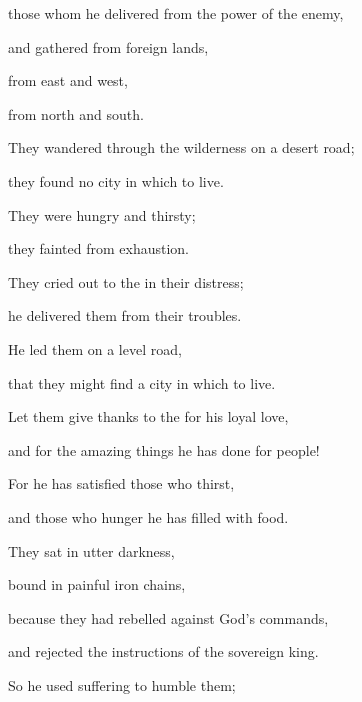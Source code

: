 {\par }{\Q those whom
he delivered
from the power
of the enemy,
\par }{\Q {}and gathered
from
foreign lands,
\par }{\Q from east
and west,
\par }{\Q from north
and south.
\par }{\Q {}They wandered
through the wilderness
on a desert
road;
\par }{\Q they found
no
city
in which to live.
\par }{\Q {}They were hungry
and thirsty;
\par }{\Q they fainted
from exhaustion.
\par }{\Q {}They cried out
to
the
{}
in their distress;
\par }{\Q he delivered
them
from their troubles.
\par }{\Q {}He led them on a level
road,
\par }{\Q that they might find a city
in which to live.
\par }{\Q {}Let them give thanks
to the
{}
for his loyal love,
\par }{\Q and for the amazing
things he has done for people!
\par }{\Q {}For
he has satisfied
those who
thirst,
\par }{\Q and those who
hunger
he has filled
with food.
\par }{\Q {}They sat
in utter darkness,
\par }{\Q bound
in painful
iron chains,
\par }{\Q {}because
they had rebelled
against God’s
commands,

\par }{\Q and rejected
the instructions
of the sovereign king.
\par }{\Q {}So he used suffering
to humble
them;

}
